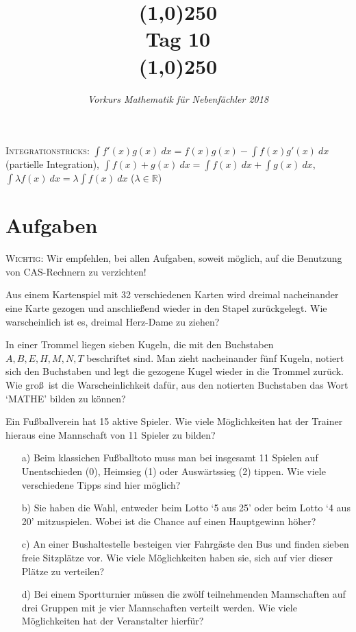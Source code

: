 \documentclass[11pt]{article}
\begin{document}
\title{\line(1,0){250}\\Tag 10\\\line(1,0){250}}
\date{}
\author{\itshape Vorkurs Mathematik für Nebenfächler 2018}
\maketitle
\begin{framed}
	\noindent \scriptsize
	\textsc{Integrationstricks:} $\int f'(x)g(x)~dx =f(x)g(x)-\int f(x)g'(x)~dx$ (partielle Integration), $\int f(x)+g(x)~dx = \int f(x)~dx + \int g(x)~dx$, $\int \lambda f(x)~dx = \lambda \int f(x)~dx$ ($\lambda \in \mathbb{R}$)
\end{framed}
\section*{Aufgaben}
\textsc{Wichtig:} Wir empfehlen, bei allen Aufgaben, soweit möglich, auf die Benutzung von CAS-Rechnern zu verzichten!
\begin{task}
	Aus einem Kartenspiel mit 32 verschiedenen Karten wird dreimal nacheinander eine Karte gezogen und anschlie\ss end wieder in den Stapel zur\" uckgelegt. Wie warscheinlich ist es, dreimal Herz-Dame zu ziehen?  
	\item In einer Trommel liegen sieben Kugeln, die mit den Buchstaben $A,B,E,H,M,N,T$ beschriftet sind. Man zieht nacheinander f\" unf Kugeln, notiert sich den Buchstaben und legt die gezogene Kugel wieder in die Trommel zur\" uck. Wie gro\ss \ ist die Warscheinlichkeit daf\" ur, aus den notierten Buchstaben das Wort `MATHE' bilden zu k\" onnen? 
\end{task}

\begin{task}
	Ein Fu\ss ballverein hat 15 aktive Spieler. Wie viele M\" oglichkeiten hat der Trainer hieraus eine Mannschaft von 11 Spieler zu bilden?
\end{task}

\begin{task}
	\begin{itemize}
		\item[a)]Beim klassichen Fu\ss balltoto muss man bei insgesamt 11 Spielen auf Unentschieden (0), Heimsieg (1) oder Ausw\" artssieg (2) tippen. Wie viele verschiedene Tipps sind hier m\" oglich?
		\item[b)] Sie haben die Wahl, entweder beim Lotto `5 aus 25' oder beim Lotto `4 aus 20' mitzuspielen. Wobei ist die Chance auf einen Hauptgewinn h\" oher?
		\item[c)] An einer Bushaltestelle besteigen vier Fahrg\" aste den Bus und finden sieben freie Sitzpl\" atze vor. Wie viele M\" oglichkeiten haben sie, sich auf vier dieser Pl\" atze zu verteilen?
		\item[d)] Bei einem Sportturnier m\" ussen die zw\" olf teilnehmenden Mannschaften auf drei Gruppen mit je vier Mannschaften verteilt werden. Wie viele M\" oglichkeiten hat der Veranstalter hierf\" ur?
	\end{itemize}
\end{task}
\end{document}
